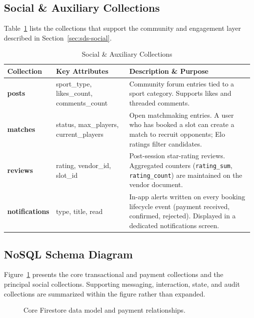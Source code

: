 \subsection{Social \& Auxiliary Collections}
Table~\ref{tab:entities-social} lists the collections that support the community and
engagement layer described in Section~\ref{sec:sds-social}.

\begin{table}[H]
    \centering
    \caption{Social \& Auxiliary Collections}
    \label{tab:entities-social}
    \small
    \setlength{\tabcolsep}{4pt}
    \begin{tabular}{|p{3.0cm}|p{4.2cm}|p{6.0cm}|}
    \hline
    \textbf{Collection} & \textbf{Key Attributes} & \textbf{Description \& Purpose} \\ \hline
    \textbf{posts} & sport\_type, likes\_count, comments\_count & Community forum entries tied to a sport category. Supports likes and threaded comments. \\ \hline
    \textbf{matches} & status, max\_players, current\_players & Open matchmaking entries. A user who has booked a slot can create a match to recruit opponents; Elo ratings filter candidates. \\ \hline
    \textbf{reviews} & rating, vendor\_id, slot\_id & Post-session star-rating reviews. Aggregated counters (\texttt{rating\_sum}, \texttt{rating\_count}) are maintained on the vendor document. \\ \hline
    \textbf{notifications} & type, title, read & In-app alerts written on every booking lifecycle event (payment received, confirmed, rejected). Displayed in a dedicated notifications screen. \\ \hline
    \end{tabular}
\end{table}

\clearpage
\subsection{NoSQL Schema Diagram}
Figure~\ref{fig:sds-erd} presents the core transactional and payment collections and the principal social collections. Supporting messaging, interaction, state, and audit collections are summarized within the figure rather than expanded.

\begin{figure}[H]
    \centering
    \caption{Core Firestore data model and payment relationships.}
    \label{fig:sds-erd}
\end{figure}

